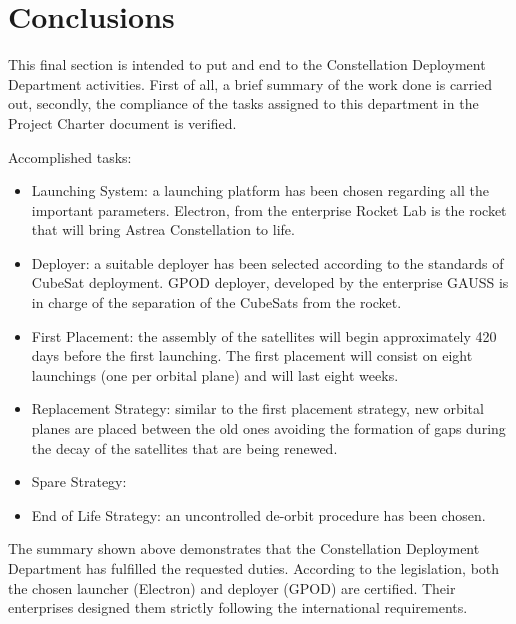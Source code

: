 \section{Conclusions}
This final section is intended to put and end to the Constellation Deployment Department activities. First of all, a brief summary of the work done is carried out, secondly, the compliance of the tasks assigned to this department in the Project Charter document is verified. 

Accomplished tasks: 

\begin{itemize}
\item Launching System: a launching platform has been chosen regarding all the important parameters. Electron, from the enterprise Rocket Lab is the rocket that will bring Astrea Constellation to life. 
\item Deployer: a suitable deployer has been selected according to the standards of CubeSat deployment. GPOD deployer, developed by the enterprise GAUSS is in charge of the separation of the CubeSats from the rocket. 
\item First Placement: the assembly of the satellites will begin approximately 420 days before the first launching. The first placement will consist on eight launchings (one per orbital plane) and will last eight weeks. 
\item Replacement Strategy: similar to the first placement strategy, new orbital planes are placed between the old ones avoiding the formation of gaps during the decay of the satellites that are being renewed.
\item Spare Strategy:
\item End of Life Strategy: an uncontrolled de-orbit procedure has been chosen. 
\end{itemize}

The summary shown above demonstrates that the Constellation Deployment Department has fulfilled the requested duties. According to the legislation, both the chosen launcher (Electron) and deployer (GPOD) are certified. Their enterprises designed them strictly following the international requirements. 